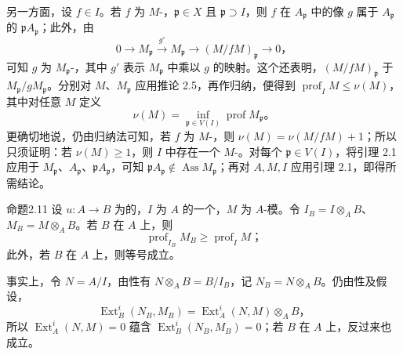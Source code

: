 另一方面，设 $f\in I$。若 $f$ 为 $M$-，$\mathfrak p\in X$ 且 $\mathfrak p\supset I$，则 $f$ 在 $A_{\mathfrak p}$ 中的像 $g$ 属于 $A_{\mathfrak p}$ 的 $\mathfrak pA_{\mathfrak p}$；此外，由
\[
0\longrightarrow M_{\mathfrak p}\xrightarrow{g'}M_{\mathfrak p}
\longrightarrow(M/fM)_{\mathfrak p}\longrightarrow0，\tag{2.3}
\]
可知 $g$ 为 $M_{\mathfrak p}$-，其中 $g'$ 表示 $M_{\mathfrak p}$ 中乘以 $g$ 的映射。这个还表明，$(M/fM)_{\mathfrak p}$ 于 $M_{\mathfrak p}/gM_{\mathfrak p}$。分别对 $M$、$M_{\mathfrak p}$ 应用推论 2.5，再作归纳，便得到 $\operatorname{prof}_IM\le\nu(M)$，其中对任意 $M$ 定义
\[
\nu(M)=\inf_{\mathfrak p\in V(I)}\operatorname{prof}M_{\mathfrak p}。
\]
更确切地说，仍由归纳法可知，若 $f$ 为 $M$-，则 $\nu(M)=\nu(M/fM)+1$；所以只须证明：若 $\nu(M)\ge1$，则 $I$ 中存在一个 $M$-。对每个 $\mathfrak p\in V(I)$，将引理 2.1 应用于 $M_{\mathfrak p}$、$A_{\mathfrak p}$、$\mathfrak pA_{\mathfrak p}$，可知 $\mathfrak pA_{\mathfrak p}\notin\operatorname{Ass}M_{\mathfrak p}$；再对 $A,M,I$ 应用引理 2.1，即得所需结论。
\begin{SGAresult}{命题}{2.11}
设 $u:A\to B$ 为的，$I$ 为 $A$ 的一个，$M$ 为 $A$-模。令 $I_B=I\otimes_AB$、$M_B=M\otimes_AB$。若 $B$ 在 $A$ 上，则
\[
\operatorname{prof}_{I_B}M_B\ge\operatorname{prof}_IM；
\]
此外，若 $B$ 在 $A$ 上，则等号成立。
\end{SGAresult}
事实上，令 $N=A/I$，由性有 $N\otimes_AB=B/I_B$，记 $N_B=N\otimes_AB$。仍由性及假设，
\[
\operatorname{Ext}_B^i(N_B,M_B)=\operatorname{Ext}_A^i(N,M)\otimes_AB，
\]
所以 $\operatorname{Ext}_A^i(N,M)=0$ 蕴含 $\operatorname{Ext}_B^i(N_B,M_B)=0$；若 $B$ 在 $A$ 上，反过来也成立。

